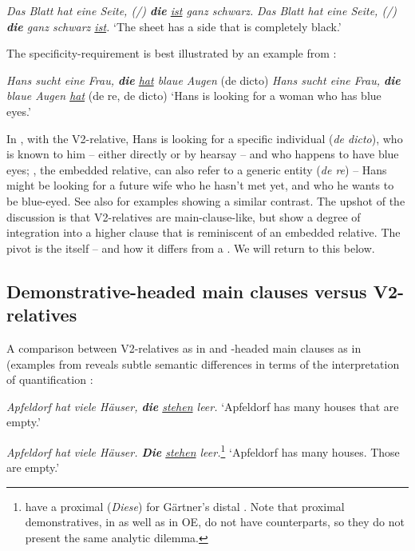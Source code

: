 \documentclass[output=paper,colorlinks,citecolor=brown]{langscibook}
\begin{document}
 \ea\label{ex:los:17}
  \ea \label{ex:los:17a}
{\itshape Das Blatt hat eine Seite, (/) \textbf{die} \underline{ist} ganz schwarz.}
\ex \label{ex:los:17b}
{\itshape Das Blatt hat eine Seite, (/) \textbf{die} ganz schwarz \underline{ist}.}
\glt ‘The sheet has a side that is completely black.' \hfill \citep[98]{Gärtner2001}
\z
\z

The specificity-requirement is best illustrated by an example from \citet{ConiglioHinterhölzl2020}: 

\ea\label{ex:los:18}
\ea \label{ex:los:18a}
{\itshape Hans sucht eine Frau, \textbf{die} \underline{hat} blaue Augen} ({de dicto})
\ex\label{ex:los:18b}
{\itshape Hans sucht eine Frau, \textbf{die} blaue Augen \underline{hat}} ({de re}, {de dicto})
\glt ‘Hans is looking for a woman who has blue eyes.'
\z
\z

In , with the V2-relative, Hans is looking for a specific individual (\textit{de dicto}), who is known to him – either directly or by hearsay – and who happens to have blue eyes; , the embedded relative, can also refer to a generic entity (\textit{de re}) – Hans might be looking for a future wife who he hasn't met yet, and who he wants to be blue-eyed. See also \citet[119--120]{Gärtner2001} for examples showing a similar contrast. The upshot of the discussion is that V2-relatives are main-clause-like, but show a degree of integration into a higher clause that is reminiscent of an embedded relative. The pivot is the  itself – and how it differs from a . We will return to this below.


\subsection{Demonstrative-headed main clauses versus V2-relatives} \label{sec:los:3.3}
A comparison between V2-relatives as in  and -headed main clauses as in  (examples from \citep[133]{Gärtner2001} reveals subtle semantic differences in terms of the interpretation of quantification \citep[see also][205]{ConiglioHinterhölzl2020}:

\ea\label{ex:los:19}
\ea \label{ex:los:19a}
{\itshape Apfeldorf hat viele Häuser, \textbf{die} \underline{stehen} leer.}
\glt ‘Apfeldorf has many houses that are empty.'

\ex \label{ex:los:19b} 
{\itshape Apfeldorf hat viele Häuser. \textbf{Die} \underline{stehen} leer.}\footnote{\citet{ConiglioHinterhölzl2020} have a proximal  (\textit{Diese}) for Gärtner's distal . Note that proximal demonstratives, in  as well as in OE, do not have  counterparts, so they do not present the same analytic dilemma.}
\glt ‘Apfeldorf has many houses. Those are empty.'
\z\z
\end{document}
